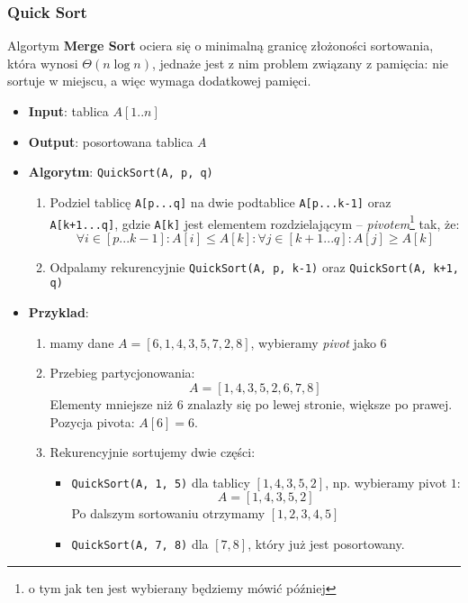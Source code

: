\documentclass[11pt,a4paper]{article}
\begin{document}
\subsubsection{Quick Sort}
Algortym \textbf{Merge Sort} ociera się o minimalną granicę złożoności sortowania, która wynosi $\Theta(n \log n)$, jednaże jest z nim problem związany z pamięcia: nie sortuje w miejscu, a więc wymaga dodatkowej pamięci.
\begin{itemize}
    \item \textbf{Input}: tablica $A[1..n]$
    \item \textbf{Output}: posortowana tablica $A$
    \item \textbf{Algorytm}: \texttt{QuickSort(A, p, q)}
        \begin{enumerate}
            \item Podziel tablicę \texttt{A[p...q]} na dwie podtablice \texttt{A[p...k-1]} oraz \texttt{A[k+1...q]}, gdzie \texttt{A[k]} jest elementem rozdzielającym -- \textit{pivotem}\footnote{o tym jak ten  jest wybierany będziemy mówić później} tak, że:
                \[
                    \forall i \in [p...k-1]: A[i] \leq A[k]: \forall j \in [k+1...q]: A[j] \geq A[k]
                \]
            \item Odpalamy rekurencyjnie \texttt{QuickSort(A, p, k-1)} oraz \texttt{QuickSort(A, k+1, q)}
        \end{enumerate}
    \item \textbf{Przyklad}:
        \begin{enumerate}
            \item mamy dane $A = [6,1,4,3,5,7,2,8]$, wybieramy \textit{pivot} jako $6$
            \item Przebieg partycjonowania:
            \[
                A = [1,4,3,5,2,6,7,8]
            \]
            Elementy mniejsze niż $6$ znalazły się po lewej stronie, większe po prawej. Pozycja pivota: $A[6] = 6$.
            \item Rekurencyjnie sortujemy dwie części:
            \begin{itemize}
                \item \texttt{QuickSort(A, 1, 5)} dla tablicy $[1,4,3,5,2]$, np. wybieramy pivot $1$:
                \[
                    A = [1,4,3,5,2]
                \]
                Po dalszym sortowaniu otrzymamy $[1,2,3,4,5]$
                \item \texttt{QuickSort(A, 7, 8)} dla $[7,8]$, który już jest posortowany.
            \end{itemize}

\end{enumerate}
\end{itemize}
\end{document}

